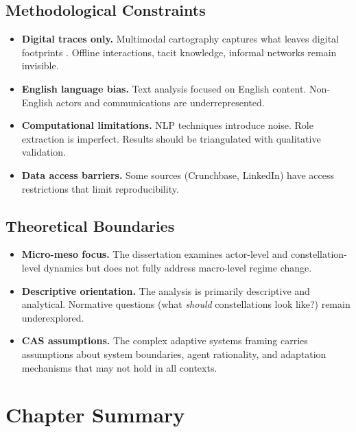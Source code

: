 \documentclass[../main.tex]{subfiles}
\begin{document}
\subsection{Methodological Constraints}

\begin{itemize}[leftmargin=*, itemsep=0.3em]
\item \textbf{Digital traces only.} Multimodal cartography captures what leaves digital footprints \cite{ruths2014social,boyd2012critical}. Offline interactions, tacit knowledge, informal networks remain invisible.

\item \textbf{English language bias.} Text analysis focused on English content. Non-English actors and communications are underrepresented.

\item \textbf{Computational limitations.} NLP techniques introduce noise. Role extraction is imperfect. Results should be triangulated with qualitative validation.

\item \textbf{Data access barriers.} Some sources (Crunchbase, LinkedIn) have access restrictions that limit reproducibility.
\end{itemize}

\subsection{Theoretical Boundaries}

\begin{itemize}[leftmargin=*, itemsep=0.3em]
\item \textbf{Micro-meso focus.} The dissertation examines actor-level and constellation-level dynamics but does not fully address macro-level regime change.

\item \textbf{Descriptive orientation.} The analysis is primarily descriptive and analytical. Normative questions (what \textit{should} constellations look like?) remain underexplored.

\item \textbf{CAS assumptions.} The complex adaptive systems framing carries assumptions about system boundaries, agent rationality, and adaptation mechanisms that may not hold in all contexts.
\end{itemize}

\section{Chapter Summary}
\end{document}
